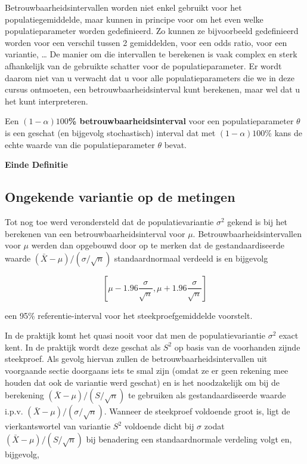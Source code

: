 \documentclass[12pt,dutch,coursenotes]{book}
\theoremstyle{definition}
\theoremstyle{definition}
\theoremstyle{definition}
\theoremstyle{remark}
\let\BeginKnitrBlock\begin \let\EndKnitrBlock\end
\begin{document}
Betrouwbaarheidsintervallen worden niet enkel gebruikt voor het
populatiegemiddelde, maar kunnen in principe voor om het even welke
populatieparameter worden gedefinieerd. Zo kunnen ze bijvoorbeeld
gedefinieerd worden voor een verschil tussen 2 gemiddelden, voor een
odds ratio, voor een variantie, \ldots{} De manier om die intervallen te
berekenen is vaak complex en sterk afhankelijk van de gebruikte schatter
voor de populatieparameter. Er wordt daarom niet van u verwacht dat u
voor alle populatieparameters die we in deze cursus ontmoeten, een
betrouwbaarheidsinterval kunt berekenen, maar wel dat u het kunt
interpreteren.

\BeginKnitrBlock{definition}[Betrouwbaarheidsinterval]
\protect\hypertarget{def:unnamed-chunk-72}{}{\label{def:unnamed-chunk-72}
\iffalse (Betrouwbaarheidsinterval) \fi{} }Een
\textbf{\((1-\alpha)100\)\% betrouwbaarheidsinterval} voor een
populatieparameter \(\theta\) is een geschat (en bijgevolg stochastisch)
interval dat met \((1-\alpha)100\)\% kans de echte waarde van die
populatieparameter \(\theta\) bevat.

\textbf{Einde Definitie}
\EndKnitrBlock{definition}

\subsection{Ongekende variantie op de metingen}\label{sec:tBI}

Tot nog toe werd verondersteld dat de populatievariantie \(\sigma^2\)
gekend is bij het berekenen van een betrouwbaarheidsinterval voor
\(\mu\). Betrouwbaarheidsintervallen voor \(\mu\) werden dan opgebouwd
door op te merken dat de gestandaardiseerde waarde
\((\bar{X} - \mu)/(\sigma/\sqrt{n})\) standaardnormaal verdeeld is en
bijgevolg

\begin{equation*}
\left[\mu - 1.96 \frac{\sigma}{\sqrt{n}},\mu + 1.96 \frac{\sigma}{\sqrt{n}}%
\right]
\end{equation*}

een 95\% referentie-interval voor het steekproefgemiddelde voorstelt.

In de praktijk komt het quasi nooit voor dat men de populatievariantie
\(\sigma^2\) exact kent. In de praktijk wordt deze geschat als \(S^2\)
op basis van de voorhanden zijnde steekproef. Als gevolg hiervan zullen
de betrouwbaarheidsintervallen uit voorgaande sectie doorgaans iets te
smal zijn (omdat ze er geen rekening mee houden dat ook de variantie
werd geschat) en is het noodzakelijk om bij de berekening
\((\bar{X} - \mu)/(S/\sqrt{n})\) te gebruiken als gestandaardiseerde
waarde i.p.v. \((\bar{X} - \mu)/(\sigma/\sqrt{n})\). Wanneer de
steekproef voldoende groot is, ligt de vierkantswortel van variantie
\(S^2\) voldoende dicht bij \(\sigma\) zodat
\({(\bar{X} - \mu)}/{(S/\sqrt{n}) }\) bij benadering een
standaardnormale verdeling volgt en, bijgevolg,
\end{document}
